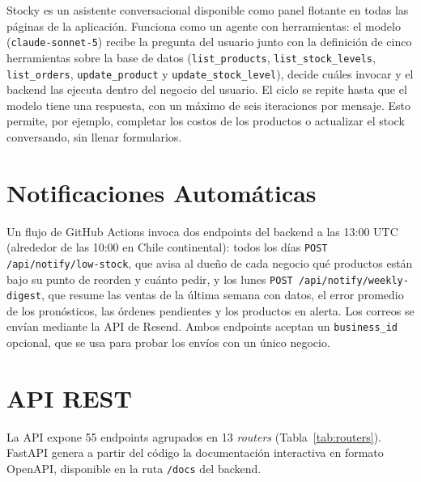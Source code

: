 \documentclass[12pt, a4paper]{report}
\begin{document}
Stocky es un asistente conversacional disponible como panel flotante en todas las páginas
de la aplicación. Funciona como un agente con herramientas: el modelo
(\texttt{claude-sonnet-5}) recibe la pregunta del usuario junto con la definición de cinco
herramientas sobre la base de datos (\texttt{list\_products}, \texttt{list\_stock\_levels},
\texttt{list\_orders}, \texttt{update\_product} y \texttt{update\_stock\_level}), decide
cuáles invocar y el backend las ejecuta dentro del negocio del usuario. El ciclo se repite
hasta que el modelo tiene una respuesta, con un máximo de seis iteraciones por mensaje.
Esto permite, por ejemplo, completar los costos de los productos o actualizar el stock
conversando, sin llenar formularios.

\section{Notificaciones Automáticas}

Un flujo de GitHub Actions invoca dos endpoints del backend a las 13:00 UTC (alrededor de
las 10:00 en Chile continental): todos los días \texttt{POST /api/notify/low-stock}, que
avisa al dueño de cada negocio qué productos están bajo su punto de reorden y cuánto pedir,
y los lunes \texttt{POST /api/notify/weekly-digest}, que resume las ventas de la última
semana con datos, el error promedio de los pronósticos, las órdenes pendientes y los
productos en alerta. Los correos se envían mediante la API de Resend. Ambos endpoints
aceptan un \texttt{business\_id} opcional, que se usa para probar los envíos con un único
negocio.

\section{API REST}

La API expone 55 endpoints agrupados en 13 \textit{routers} (Tabla~\ref{tab:routers}).
FastAPI genera a partir del código la documentación interactiva en formato OpenAPI,
disponible en la ruta \texttt{/docs} del backend.
\end{document}
